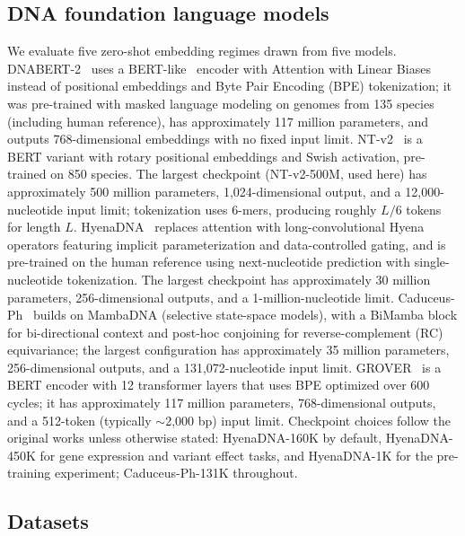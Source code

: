\documentclass[11pt,a4paper]{article}
\begin{document}
\subsection{DNA foundation language models}
We evaluate five zero-shot embedding regimes drawn from five models. DNABERT-2~\citep{zhou2023dnabert2} uses a BERT-like~\citep{devlin2019bert} encoder with Attention with Linear Biases instead of positional embeddings and Byte Pair Encoding (BPE) tokenization; it was pre-trained with masked language modeling on genomes from 135 species (including human reference), has approximately 117 million parameters, and outputs 768-dimensional embeddings with no fixed input limit. NT-v2~\citep{dalla2023nucleotide} is a BERT variant with rotary positional embeddings and Swish activation, pre-trained on 850 species. The largest checkpoint (NT-v2-500M, used here) has approximately 500 million parameters, 1{,}024-dimensional output, and a 12{,}000-nucleotide input limit; tokenization uses 6-mers, producing roughly $L/6$ tokens for length $L$. HyenaDNA~\citep{nguyen2023hyenadna} replaces attention with long-convolutional Hyena operators featuring implicit parameterization and data-controlled gating, and is pre-trained on the human reference using next-nucleotide prediction with single-nucleotide tokenization. The largest checkpoint has approximately 30 million parameters, 256-dimensional outputs, and a 1-million-nucleotide limit. Caduceus-Ph~\citep{schiff2024caduceus} builds on MambaDNA (selective state-space models), with a BiMamba block for bi-directional context and post-hoc conjoining for reverse-complement (RC) equivariance; the largest configuration has approximately 35 million parameters, 256-dimensional outputs, and a 131{,}072-nucleotide input limit. GROVER~\citep{sanabria2024grover} is a BERT encoder with 12 transformer layers that uses BPE optimized over 600 cycles; it has approximately 117 million parameters, 768-dimensional outputs, and a 512-token (typically $\sim$2{,}000 bp) input limit. Checkpoint choices follow the original works unless otherwise stated: HyenaDNA-160K by default, HyenaDNA-450K for gene expression and variant effect tasks, and HyenaDNA-1K for the pre-training experiment; Caduceus-Ph-131K throughout.

\subsection{Datasets}
\end{document}
